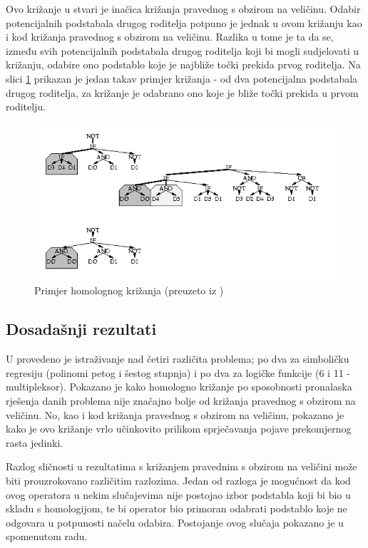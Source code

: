 Ovo križanje u stvari je inačica križanja pravednog s obzirom na veličinu. Odabir potencijalnih podstabala drugog roditelja potpuno je jednak u ovom križanju kao i kod križanja pravednog s obzirom na veličinu. Razlika u tome je ta da se, između svih potencijalnih podstabala drugog roditelja koji bi mogli sudjelovati u križanju, odabire ono podstablo koje je najbliže točki prekida prvog roditelja. Na slici \ref{crxHomo} prikazan je jedan takav primjer križanja - od dva potencijalna podstabala drugog roditelja, za križanje je odabrano ono koje je bliže točki prekida u prvom roditelju.

\begin{figure}[H]
	\centering
	\includegraphics[scale=0.6]{./slike/crxHomo.png}
	\caption{Primjer homolognog križanja (preuzeto iz  \cite{crxSizeFair})}
	\label{crxHomo}
\end{figure}

\subsection{Dosadašnji rezultati}
U \cite{crxSizeFair}  provedeno je istraživanje nad četiri različita problema; po dva za simboličku regresiju (polinomi petog i šestog stupnja) i po dva za logičke funkcije (6 i 11 - multipleksor). Pokazano je kako homologno križanje po sposobnosti pronalaska rješenja danih problema nije značajno bolje od križanja pravednog s obzirom na veličinu. No, kao i kod križanja pravednog s obzirom na veličinu, pokazano je kako je ovo križanje vrlo učinkovito prilikom sprječavanja pojave prekomjernog rasta jedinki.

Razlog sličnosti u rezultatima s križanjem pravednim s obzirom na veličini može biti prouzrokovano različitim razlozima. Jedan od razloga je mogućnost da kod ovog operatora u nekim slučajevima nije postojao izbor podstabla koji bi bio u skladu s homologijom, te bi operator bio primoran odabrati podstablo koje ne odgovara u potpunosti načelu odabira. Postojanje ovog slučaja pokazano je u spomenutom radu.

